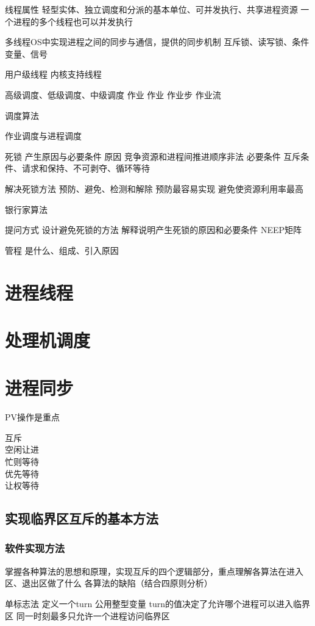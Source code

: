 线程属性
轻型实体、独立调度和分派的基本单位、可并发执行、共享进程资源
一个进程的多个线程也可以并发执行



多线程OS中实现进程之间的同步与通信，提供的同步机制
互斥锁、读写锁、条件变量、信号

用户级线程
内核支持线程

高级调度、低级调度、中级调度
作业
作业 作业步 作业流

调度算法

作业调度与进程调度

死锁
产生原因与必要条件
原因 竞争资源和进程间推进顺序非法
必要条件 互斥条件、请求和保持、不可剥夺、循环等待

解决死锁方法
预防、避免、检测和解除
预防最容易实现
避免使资源利用率最高

银行家算法


提问方式
设计避免死锁的方法
解释说明产生死锁的原因和必要条件
NEEP矩阵

管程 是什么、组成、引入原因


\section{进程线程}
\section{处理机调度}
\section{进程同步}
PV操作是重点

互斥 \\ 
空闲让进 \\
忙则等待 \\ 
优先等待 \\ 
让权等待 \\ 

\subsection{实现临界区互斥的基本方法}
\subsubsection{软件实现方法}
掌握各种算法的思想和原理，实现互斥的四个逻辑部分，重点理解各算法在进入区、退出区做了什么
各算法的缺陷（结合四原则分析）

单标志法
定义一个turn 公用整型变量
turn的值决定了允许哪个进程可以进入临界区
同一时刻最多只允许一个进程访问临界区

